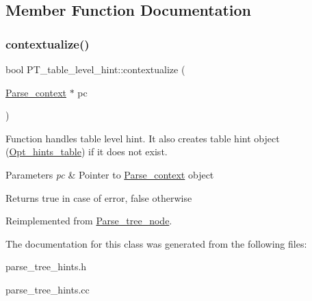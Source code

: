 \subsection{Member Function Documentation}
\mbox{\label{classPT__table__level__hint_ab7601fb1f9159525f67e3dcf14c36e9a}} 
\subsubsection{\texorpdfstring{contextualize()}{contextualize()}}
{\footnotesize\ttfamily bool P\+T\+\_\+table\+\_\+level\+\_\+hint\+::contextualize (\begin{DoxyParamCaption}\item[{\mbox{\hyperlink{structParse__context}{Parse\+\_\+context}} $\ast$}]{pc }\end{DoxyParamCaption})\hspace{0.3cm}{\ttfamily [virtual]}}

Function handles table level hint. It also creates table hint object (\mbox{\hyperlink{classOpt__hints__table}{Opt\+\_\+hints\+\_\+table}}) if it does not exist.


\begin{DoxyParams}{Parameters}
{\em pc} & Pointer to \mbox{\hyperlink{structParse__context}{Parse\+\_\+context}} object\\
\hline
\end{DoxyParams}
\begin{DoxyReturn}{Returns}
true in case of error, false otherwise 
\end{DoxyReturn}


Reimplemented from \mbox{\hyperlink{classParse__tree__node_a22d93524a537d0df652d7efa144f23da}{Parse\+\_\+tree\+\_\+node}}.



The documentation for this class was generated from the following files\+:\begin{DoxyCompactItemize}
\item 
parse\+\_\+tree\+\_\+hints.\+h\item 
parse\+\_\+tree\+\_\+hints.\+cc\end{DoxyCompactItemize}
